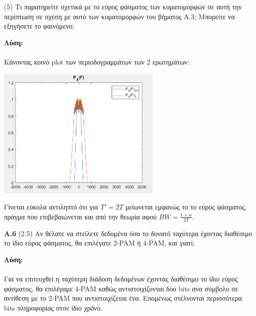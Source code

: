 \begin{justify}
    (5) Τι παρατηρείτε σχετικά με το εύρος φάσματος 
    των κυματομορφών σε αυτή την
    περίπτωση σε σχέση με αυτό των κυματομορφών 
    του βήματος Α.3\textlatin{;} Μπορείτε να εξηγήσετε το φαινόμενο\textlatin{;}
\end{justify}

\begin{justify}
    {\bf Λύση:}\\\\
    Κάνοντας κοινό \textlatin{plot} των περιοδογραμμάτων των 2
    ερωτημάτων:
\end{justify}

\begin{center}
    \centering
    \includegraphics[width=0.6\textwidth]{ALPHA/images/a5.4.png} %
\end{center}



\begin{justify}
    Γίνεται εύκολα αντιληπτό ότι για $T'=2T$ μείωνεται εμφανώς το
    το εύρος φάσματος, πράγμα που επιβεβαιώνεται και από την θεωρία αφού
    $BW=\frac{1+\alpha}{2Τ}$.
\end{justify}

\newpage


\begin{justify}
    {\bf Α.6} (2.5) Αν θέλατε να στείλετε δεδομένα
    όσο το δυνατό ταχύτερα έχοντας διαθέσιμο το ίδιο εύρος
    φάσματος, θα επιλέγατε \textlatin{2-PAM} ή \textlatin{4-PAM},
    και γιατί\textlatin{;}    
\end{justify}

\begin{justify}
    {\bf Λύση:}\\\\
    Για να επιτευχθεί η ταχύτερη διάδοση δεδομένων έχοντας διαθέσιμο
    το ίδιο εύρος φάσματος, θα επιλέγαμε \textlatin{4-PAM} καθώς 
    αντιστοιχίζονται δύο \textlatin{bits} ανα σύμβολο σε αντίθεση
    με το \textlatin{2-PAM} που αντιστοιχίζεται ένα. Επομένως στέλνονται
    περισσότερα \textlatin{bits} πληροφορίας στον ίδιο χρόνο.
\end{justify}


